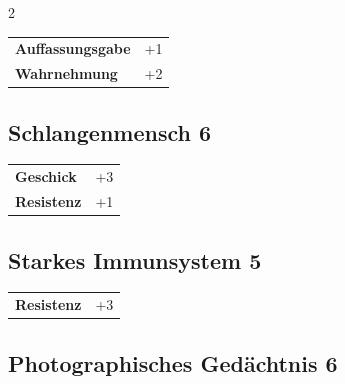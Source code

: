 \begin{multicols}{2}
\begin{tcolorbox}
\begin{tabular}{@{}ll@{}}
    \textbf{Auffassungsgabe} & +1\\
    \textbf{Wahrnehmung} & +2\\
\end{tabular}


\end{tcolorbox}

\begin{tcolorbox}
    \subsection*{Schlangenmensch \hfill \small{6 }}
    \tcblower




\begin{tabular}{@{}ll@{}}
    \textbf{Geschick} & +3\\
    \textbf{Resistenz} & +1\\
\end{tabular}


\end{tcolorbox}

\begin{tcolorbox}
    \subsection*{Starkes Immunsystem \hfill \small{5 }}
    \tcblower




\begin{tabular}{@{}ll@{}}
    \textbf{Resistenz} & +3\\
\end{tabular}


\end{tcolorbox}

\begin{tcolorbox}
    \subsection*{Photographisches Gedächtnis \hfill \small{6 }}
    \tcblower





\end{tcolorbox}
\end{multicols}
